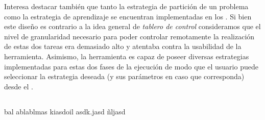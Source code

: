 Interesa destacar también que tanto la estrategia de partición de un problema
como la estrategia de aprendizaje se encuentran implementadas en los \ws. Si
bien este diseño es contrario a la idea general de \emph{tablero de control}
consideramos que el nivel de granularidad necesario para poder controlar
remotamente la realización de estas dos tareas era demasiado alto y atentaba
contra la usabilidad de la herramienta. Asimismo, la herramienta es capaz de
poseer diversas estrategias implementadas para estas dos fases de la ejecución
de modo que el usuario puede seleccionar la estrategia deseada (y sus
parámetros en caso que corresponda) desde el \fend.

\subsection{\fend}

bal ablablmas
kiasdoil
asdk.jasd
ñljasd


